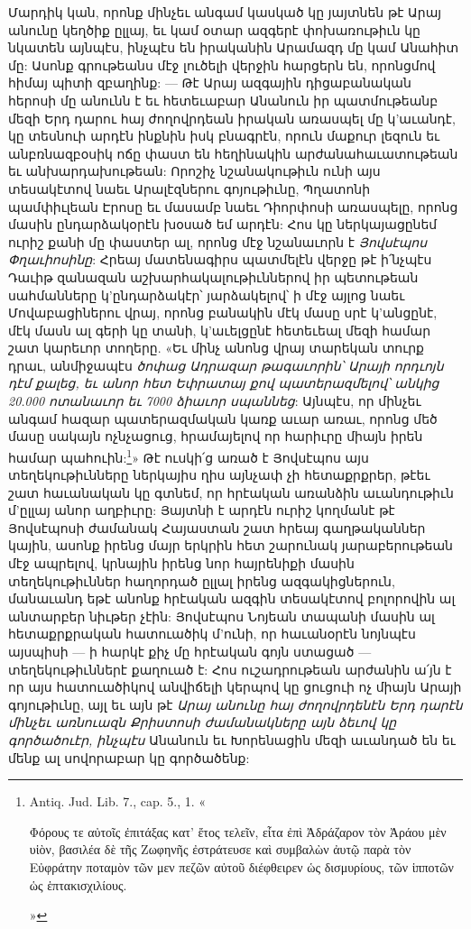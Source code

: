 \documentclass{article}
\begin{document}
{Մարդիկ կան, որոնք մինչեւ անգամ կասկած կը յայտնեն թէ Արայ անունը կեղծիք ըլլայ, եւ կամ օտար ազգերէ փոխառութիւն կը նկատեն այնպէս, ինչպէս են իրականին Արամազդ մը կամ Անահիտ մը: Ասոնք գրութեանս մէջ լուծելի վերջին հարցերն են, որոնցմով հիմայ պիտի զբաղինք: — Թէ Արայ ազգային դիցաբանական հերոսի մը անունն է եւ հետեւաբար Անանուն իր պատմութեանբ մեզի Երդ դարու հայ ժողովրդեան իրական առասպել մը կ'աւանդէ, կը տեսնուի արդէն ինքնին իսկ բնագրէն, որուն մաքուր լեզուն եւ անբռնազբօսիկ ոճը փաստ են հեղինակին արժանահաւատութեան եւ անխարդախութեան: Որոշիչ նշանակութիւն ունի այս տեսակէտով նաեւ Արալէզներու գոյութիւնը, Պղատոնի պամփիւլեան Էրոսը եւ մասամբ նաեւ Դիորփոսի առասպելը, որոնց մասին ընդարձակօրէն խօսած եմ արդէն: Հոս կը ներկայացընեմ ուրիշ քանի մը փաստեր ալ, որոնց մէջ նշանաւորն է \emph{Յովսէպոս Փղաւիոսինը}: Հրեայ մատենագիրս պատմելէն վերջը թէ ի՛նչպէս Դաւիթ զանազան աշխարհակալութիւններով իր պետութեան սահմանները կ'ընդարձակէր՝ յարձակելով՝ ի մէջ այլոց նաեւ Մովաբացիներու վրայ, որոնց բանակին մէկ մասը սրէ կ'անցընէ, մէկ մասն ալ գերի կը տանի, կ'աւելցընէ հետեւեալ մեզի համար շատ կարեւոր տողերը. «Եւ մինչ անոնց վրայ տարեկան տուրք դրաւ, անմիջապէս \emph{ծոփաց Ադրազար թագաւորին՝ Արայի որդւոյն դէմ քալեց, եւ անոր հետ Եփրատայ քով պատերազմելով՝ անկից 20.000 ոտանաւոր եւ 7000 ձիաւոր սպաննեց}: Այնպէս, որ մինչեւ անգամ հազար պատերազմական կառք աւար առաւ, որոնց մեծ մասը սակայն ոչնչացուց, հրամայելով որ հարիւրը միայն իրեն համար պահուին:\footnote{Antiq. Jud. Lib. 7., cap. 5., 1. «\begin{greek}Φόρους τε αὐτοῖς ἐπιτάξας κατ' ἔτος τελεῖν, εἶτα ἐπὶ Ἀδράζαρον τὸν Ἀράου μὲν υἱὸν, βασιλέα δὲ τῆς Ζωφηνῆς ἐστράτευσε καὶ συμβαλὼν ἀυτῷ παρὰ τὸν Εὐφράτην ποταμὸν τῶν μεν πεζῶν αὐτοῦ διέφθειρεν ὡς δισμυρίους, τῶν ἱπποτῶν ὡς ἑπτακισχιλίους.\end{greek}»}» Թէ ուսկի՛ց առած է Յովսէպոս այս տեղեկութիւնները ներկայիս ղիս այնչափ չի հետաքրքրեր, թէեւ շատ հաւանական կը գտնեմ, որ հրէական առանձին աւանդութիւն մ'ըլլայ անոր աղբիւրը: Յայտնի է արդէն ուրիշ կողմանէ թէ Յովսէպոսի ժամանակ Հայաստան շատ հրեայ գաղթականներ կային, ասոնք իրենց մայր երկրին հետ շարունակ յարաբերութեան մէջ ապրելով, կրնային իրենց նոր հայրենիքի մասին տեղեկութիւններ հաղորդած ըլլալ իրենց ազգակիցներուն, մանաւանդ եթէ անոնք հրէական ազգին տեսակէտով բոլորովին ալ անտարբեր նիւթեր չէին: Յովսէպոս Նոյեան տապանի մասին ալ հետաքրքրական հատուածիկ մ'ունի, որ հաւանօրէն նոյնպէս այսպիսի — ի հարկէ քիչ մը հրէական գոյն ստացած — տեղեկութիւններէ քաղուած է: Հոս ուշադրութեան արժանին ա՛յն է որ այս հատուածիկով անվիճելի կերպով կը ցուցուի ոչ միայն Արայի գոյութիւնը, այլ եւ այն թէ \emph{Արայ անունը հայ ժողովրդենէն Երդ դարէն մինչեւ առնուազն Քրիստոսի ժամանակները այն ձեւով կը գործածուէր, ինչպէս} Անանուն եւ Խորենացին մեզի աւանդած են եւ մենք ալ սովորաբար կը գործածենք:

}
\end{document}
